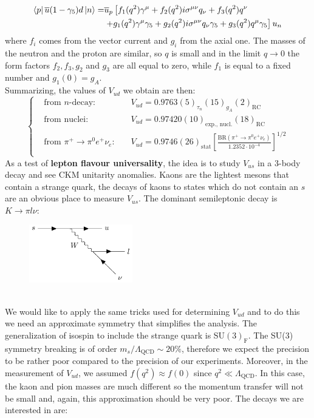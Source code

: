 \documentclass[../main.tex]{subfiles}
\begin{document}
\begin{align*}
\bra{p}\overline{u}(1-\gamma_5)d\ket{n}=&\overline{u}_p\left[f_1(q^2)\gamma^\mu+f_2(q^2)i\sigma^{\mu\nu}q_\nu+f_3(q^2)q^\nu\right.\\
&\left.+g_1(q^2)\gamma^\mu\gamma_5+g_2(q^2)i\sigma^{\mu\nu}q_\nu\gamma_5+g_3(q^2)q^\mu\gamma_5\right]u_n
\end{align*}
where $f_i$ comes from the vector current and $g_i$ from the axial one. The masses of the neutron and the proton are similar, so $q$ is small and in the limit $q\to0$ the form factors $f_2, f_3, g_2$ and $g_3$ are all equal to zero, while $f_1$ is equal to a fixed number and $g_1(0)=g_A$.\\
Summarizing, the values of $V_{ud}$ we obtain are then:
\[
\left\{
\begin{aligned}
&\text{from $n$-decay: }&&V_{ud}=0.9763(5)_{\tau_n}(15)_{g_A}(2)_{\text{RC}}\\
&\text{from nuclei: }&&V_{ud}=0.97420(10)_{\text{exp., nucl.}}(18)_{\text{RC}}\\
&\text{from $\pi^+\to\pi^0e^+\nu_e$: }&&V_{ud}=0.9746(26)_{\text{stat}}\left[\frac{\text{BR}(\pi^+\to\pi^0e^+\nu_e)}{1.2352\cdot10^{-4}}\right]^{1/2}\\
\end{aligned}
\right.
\]
As a test of \textbf{lepton flavour universality}, the idea is to study $V_{us}$ in a 3-body decay and see CKM unitarity anomalies. Kaons are the lightest mesons that contain a strange quark, the decays of kaons to states which do not contain an $s$ are an obvious place to measure $V_{us}$. The dominant semileptonic decay is $K\to\pi l\nu$:\\
\begin{figure}[h]
    \centering
    \includegraphics[width=0.4\textwidth]{Images/kaondecay.pdf}
    \caption*{}
\end{figure}\\
We would like to apply the same tricks used for determining $V_{ud}$ and to do this we need an approximate symmetry that simplifies the analysis. The generalization of isospin to include the strange quark is SU$(3)_{\text{F}}$. The SU(3) symmetry breaking is of order $m_s/\Lambda_{\text{QCD}}\sim20\%$, therefore we expect the precision to be rather poor compared to the precision of our experiments. Moreover, in the measurement of $V_{ud}$, we assumed $f(q^2)\approx f(0)$ since $q^2\ll\Lambda_{\text{QCD}}$. In this case, the kaon and pion masses are much different so the momentum transfer will not be small and, again, this approximation should be very poor. The decays we are interested in are:
\end{document}
